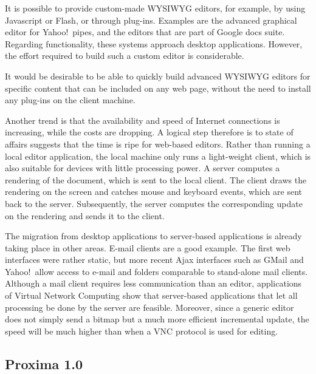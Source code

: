 \documentclass[10pt]{article}
\begin{document}
It is possible to provide custom-made WYSIWYG editors, for example, by using Javascript or Flash, or through plug-ins. Examples are the advanced graphical editor for Yahoo!\ pipes, and the editors that are part of Google docs suite. Regarding functionality, these systems approach desktop applications. However, the effort required to build such a custom editor is considerable.

It would be desirable to be able to quickly build advanced WYSIWYG editors for specific content that can be included on any web page, without the need to install any plug-ins on the client machine.


\bc
Another trend is that the availability and speed of Internet connections is increasing, while the costs are dropping. A logical step therefore is to state of affairs suggests that the time is ripe for web-based editors. Rather than running a local editor application, the local machine only runs a light-weight client, which is also suitable for devices with little processing power. A server computes a rendering of the document, which is sent to the local client. The client draws the rendering on the screen and catches mouse and keyboard events, which are sent back to the server. Subsequently, the server computes the corresponding update on the rendering and sends it to the client.

The migration from desktop applications to server-based applications is already taking place in other areas. E-mail clients are a good example. The first web interfaces were rather static, but more recent Ajax interfaces such as GMail and Yahoo!\ allow access to e-mail and folders comparable to stand-alone mail clients. Although a mail client requires less communication than an editor, applications of Virtual Network Computing show that server-based applications that let all processing be done by the server are feasible. Moreover, since a generic editor does not simply send a bitmap but a much more efficient incremental update, the speed will be much higher than when a VNC protocol is used for editing. 
\ec

\subsection{Proxima 1.0}
\end{document}
